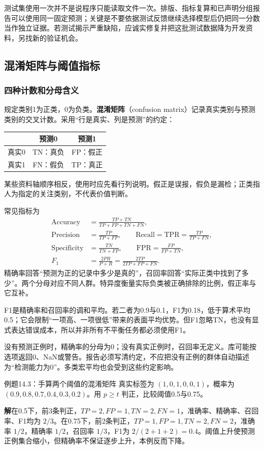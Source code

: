 \documentclass[UTF8,fontset=none,zihao=-4,a4paper]{ctexart}
\newcommand{\term}[1]{\textbf{#1}}
\newcommand{\sol}{\par\noindent\textbf{解}\quad}
\numberwithin{equation}{section}
\numberwithin{figure}{section}
\begin{document}
测试集使用一次并不是说程序只能读取文件一次。排版、指标复算和已声明分组报告可以使用同一固定预测；关键是不要依据测试反馈继续选择模型后仍把同一分数当作独立证据。若测试揭示严重缺陷，应诚实修复并把这批测试数据降为开发资料，另找新的验证机会。

\subsection{混淆矩阵与阈值指标}
\subsubsection{四种计数和分母含义}
规定类别1为正类，0为负类。\term{混淆矩阵}（confusion matrix）记录真实类别与预测类别的交叉计数。采用“行是真实、列是预测”的约定：
\begin{center}
\begin{tabular}{lcc}
\toprule
 & 预测0 & 预测1\\\midrule
真实0 & TN：真负 & FP：假正\\
真实1 & FN：假负 & TP：真正\\\bottomrule
\end{tabular}
\end{center}
某些资料轴顺序相反，使用时应先看行列说明。假正是误报，假负是漏检；正类指人为指定的关注类别，不代表价值判断。

常见指标为
\begin{align}
 \mathrm{Accuracy}&=\frac{TP+TN}{TP+FP+TN+FN},\\
 \mathrm{Precision}&=\frac{TP}{TP+FP},\qquad
 \mathrm{Recall}=\mathrm{TPR}=\frac{TP}{TP+FN},\\
 \mathrm{Specificity}&=\frac{TN}{TN+FP},\qquad
 \mathrm{FPR}=\frac{FP}{FP+TN},\\
 F_1&=\frac{2PR}{P+R}=\frac{2TP}{2TP+FP+FN}.
\end{align}
精确率回答“预测为正的记录中多少是真的”，召回率回答“实际正类中找到了多少”。两个分母对应不同人群。特异度衡量实际负类被正确排除的比例，假正率与它互补。

F1是精确率和召回率的调和平均。若二者为0.9与0.1，F1为0.18，低于算术平均0.5；它会限制“一项高、一项很低”带来的表面平均优势。但F1忽略TN，也没有显式表达错误成本，所以并非所有不平衡任务都必须使用F1。

没有预测正例时，精确率的分母为0；没有真实正例时，召回率无定义。库可能按选项返回0、NaN或警告。报告必须写清约定，不应把没有正例的群体自动描述为“检测能力为0”。多类宏平均也会受到这些约定影响。

\begin{infobox}[unbreakable]{例题14.3：手算两个阈值的混淆矩阵}
真实标签为 $(1,0,1,0,0,1)$，概率为 $(0.9,0.8,0.7,0.4,0.3,0.2)$。用 $p\ge t$ 判正，比较阈值0.5与0.75。
\sol 在0.5下，前3条判正，$TP=2,FP=1,TN=2,FN=1$，准确率、精确率、召回率、F1均为 $2/3$。在0.75下，前2条判正，$TP=1,FP=1,TN=2,FN=2$，准确率 $1/2$，精确率 $1/2$，召回率 $1/3$，F1为 $2/(2+1+2)=0.4$。阈值上升使预测正例集合缩小，但精确率不保证逐步上升，本例反而下降。
\end{infobox}
\end{document}
